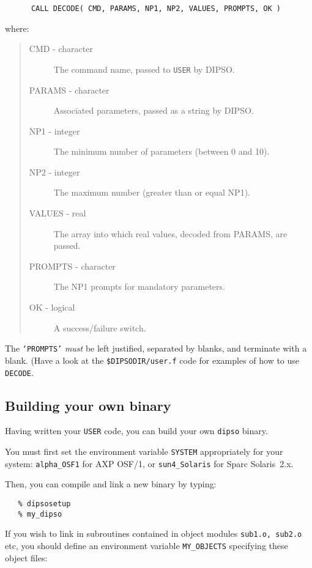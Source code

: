 \begin{verbatim}
      CALL DECODE( CMD, PARAMS, NP1, NP2, VALUES, PROMPTS, OK )
\end{verbatim}

where:

\begin{quote}
\begin{description}
\item [CMD - character] The command name, passed to {\tt{USER}}  by DIPSO.
\item [PARAMS - character]  Associated parameters, passed as a string by
DIPSO.
\item [NP1 - integer] The minimum number of parameters (between 0 and 10).
\item [NP2 - integer] The maximum number (greater than or equal NP1).
\item [VALUES - real] The array into which real values, decoded from PARAMS,
are passed.
\item [PROMPTS - character] The NP1 prompts for mandatory parameters.
\item [OK - logical] A success/failure switch.
\end{description}
\end{quote}

The {\tt{`PROMPTS'}}  {\em must} be left justified, separated by blanks,
and terminate with a blank. (Have a look at the
{\tt{\$DIPSODIR/user.f}}  code for examples of how to use {\tt{DECODE}}. 

\subsection {\label{SEC:MY_DIPSO}Building your own binary}

Having written your {\tt{USER}}  code, you can build your own {\tt{dipso}} 
binary.

You must first set the environment variable {\tt{SYSTEM}}  appropriately
for your system: {\tt{alpha\_OSF1}}  for AXP OSF/1, or {\tt{sun4\_Solaris}}  for
Sparc Solaris~2.x. 

Then, you can compile and link a new binary by typing:

\begin{verbatim}
   % dipsosetup
   % my_dipso
\end{verbatim}

If you wish to link in subroutines contained in object modules {\tt{sub1.o,} 
sub2.o} etc, you should define an environment variable {\tt{MY\_OBJECTS}} 
specifying these object files:

